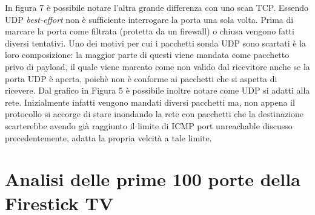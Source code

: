 \documentclass{article}
\begin{document}
In figura 7 è possibile notare l'altra grande differenza con uno scan TCP.
Essendo UDP \textit{best-effort} non è sufficiente interrogare la porta una
sola volta. Prima di marcare la porta come filtrata (protetta da un firewall)
o chiusa vengono fatti diversi tentativi. Uno dei motivi per cui i pacchetti 
sonda UDP sono scartati è la loro composizione: la maggior parte di questi viene
mandata come pacchetto privo di payload, il quale viene marcato come non valido 
dal ricevitore anche se la porta UDP è aperta, poichè non è conforme ai pacchetti 
che si aspetta di ricevere. Dal grafico in Figura 5 è possibile inoltre notare 
come UDP si adatti alla rete. Inizialmente infatti vengono mandati diversi pacchetti ma,
non appena il protocollo si accorge di stare inondando la rete con pacchetti che la destinazione 
scarterebbe avendo già raggiunto il limite di ICMP port unreachable discusso precedentemente, 
adatta la propria velcità a tale limite. 

\section{Analisi delle prime 100 porte della Firestick TV}
\end{document}
